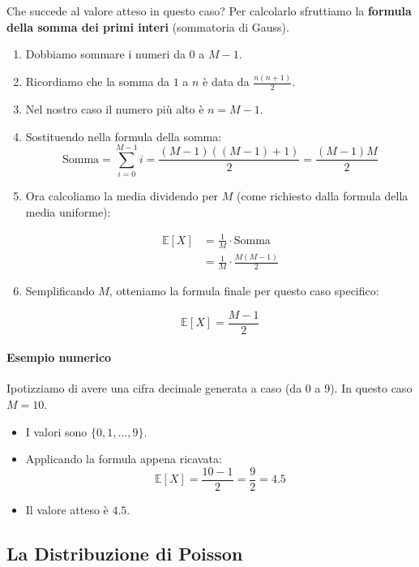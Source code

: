 Che succede al valore atteso in questo caso? Per calcolarlo sfruttiamo la \textbf{formula della somma dei primi interi} (sommatoria di Gauss).

\begin{enumerate}
    \item Dobbiamo sommare i numeri da $0$ a $M-1$.
    \item Ricordiamo che la somma da $1$ a $n$ è data da $\frac{n(n+1)}{2}$.
    \item Nel nostro caso il numero più alto è $n = M-1$.
    \item Sostituendo nella formula della somma:
    \[ \text{Somma} = \sum_{i=0}^{M-1} i = \frac{(M-1)((M-1)+1)}{2} = \frac{(M-1)M}{2} \]
    \item Ora calcoliamo la media dividendo per $M$ (come richiesto dalla formula della media uniforme):
    
    \begin{equation}
    \begin{aligned}
    \mathbb{E}[X] &= \frac{1}{M} \cdot \text{Somma} \\
    &= \frac{1}{M} \cdot \frac{M(M-1)}{2}
    \end{aligned}
    \end{equation}
    
    \item Semplificando $M$, otteniamo la formula finale per questo caso specifico:
    
    \begin{equation}
    \boxed{\mathbb{E}[X] = \frac{M-1}{2}}
    \end{equation}
\end{enumerate}

\paragraph{Esempio numerico}
Ipotizziamo di avere una cifra decimale generata a caso (da 0 a 9). In questo caso $M=10$.
\begin{itemize}
    \item I valori sono $\{0, 1, \dots, 9\}$.
    \item Applicando la formula appena ricavata:
    \[ \mathbb{E}[X] = \frac{10-1}{2} = \frac{9}{2} = 4.5 \]
    \item Il valore atteso è $4.5$.
\end{itemize}

\subsection{La Distribuzione di Poisson}

